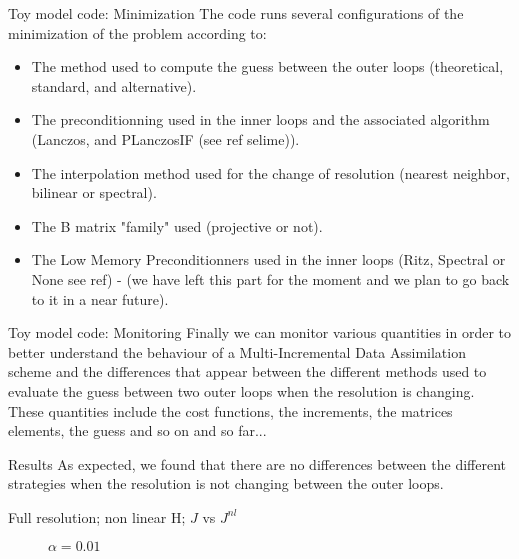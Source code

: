 \documentclass[10pt]{beamer}
\begin{document}
\begin{frame}{Toy model code: Minimization}
The code runs several configurations of the minimization of the problem according to:\\
\vspace{+0.5cm}
\begin{itemize}
 \item The method used to compute the guess between the outer loops (theoretical, standard, and alternative).
 \item The preconditionning used in the inner loops and the associated algorithm (Lanczos, and PLanczosIF (see ref selime)).
 \item The interpolation method used for the change of resolution (nearest neighbor, bilinear or spectral).
 \item The B matrix "family" used (projective or not).
 \item The Low Memory Preconditionners used in the inner loops (Ritz, Spectral or None see ref) - (we have left this part for the moment and we plan to go back to it in a near future).
\end{itemize}
\end{frame}

\begin{frame}{Toy model code: Monitoring}
 Finally we can monitor various quantities in order to better understand the behaviour of a Multi-Incremental Data Assimilation scheme and the differences that appear between the different methods used to evaluate the guess between two outer loops when the resolution is changing.\\
 These quantities include the cost functions, the increments, the matrices elements, the guess and so on and so far...
\end{frame}




\begin{frame}{Results}
As expected, we found that there are no differences between the different strategies when the resolution is not changing between the outer loops.
\end{frame}




\begin{frame}{Full resolution; non linear H; $J$ vs $J^{nl}$}
\begin{center}
\begin{figure}
  \caption{$\alpha = 0.01$}
\endminipage\hfill
{}
  \caption{$\alpha = 0.01$}
\endminipage
\end{figure}
\end{center}
\end{frame}


\usebackgroundtemplate{}
\end{document}
